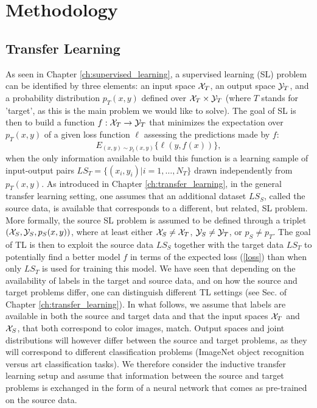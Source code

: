 \section{Methodology}
\label{sec:ch_4_methods}
\subsection{Transfer Learning}
\label{subsec:tl}

As seen in Chapter \ref{ch:supervised_learning}, a supervised learning (SL) problem can be identified by three elements: an input space ${\cal X}_T$, an output space ${\cal Y}_T$, and a probability distribution $p_T(x,y)$ defined over ${\cal X}_T\times {\cal Y}_T$ (where $T$ stands for 'target', as this is the main problem we would like to solve). The goal of SL is then to build a function $f:{\cal X}_T\rightarrow{\cal Y}_T$ that minimizes the expectation over $p_T(x,y)$ of a given loss function $\ell$ assessing the predictions made by $f$:
\begin{equation}\label{loss}
  E_{(x,y)\sim p_t(x,y)} \{\ell(y,f(x))\},
\end{equation}
when the only information available to build this function is a learning sample of input-output pairs $LS_T=\{(x_i,y_i)|i=1,\ldots,N_T\}$ drawn independently from $p_T(x,y)$. As introduced in Chapter \ref{ch:transfer_learning}, in the general transfer learning setting, one assumes that an additional dataset $LS_S$, called the source data, is available that corresponds to a different, but related, SL problem. More formally, the source SL problem is assumed to be defined through a triplet $({\cal X}_S,{\cal Y}_S,p_S(x,y))$, where at least either ${\cal X}_S\neq {\cal X}_T$, ${\cal Y}_S\neq {\cal Y}_T$, or $p_S\neq p_T$. The goal of TL is then to exploit the source data $LS_S$ together with the target data $LS_T$ to potentially find a better model $f$ in terms of the expected loss (\ref{loss}) than when only $LS_T$ is used for training this model.
We have seen that depending on the availability of labels in the target and source data, and on how the source and target problems differ, one can distinguish different TL settings (see Sec. of Chapter \ref{ch:transfer_learning}). In what follows, we assume that labels are available in both the source and target data and that the input spaces ${\cal X}_T$ and ${\cal X}_S$, that both correspond to color images, match. Output spaces and joint distributions will however differ between the source and target problems, as they will correspond to different classification problems (ImageNet object recognition versus art classification tasks). We therefore consider the inductive transfer learning setup and assume that information between the source and target problems is exchanged in the form of a neural network that comes as pre-trained on the source data. 

